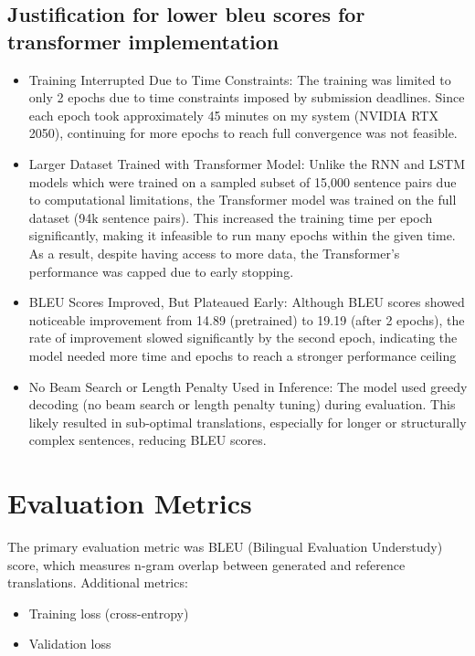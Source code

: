 \documentclass[12pt]{article}
\begin{document}
\subsection{Justification for lower bleu scores for transformer implementation}
\begin{itemize}
    \item  Training Interrupted Due to Time Constraints: The training was limited to only 2 epochs due to time constraints imposed by submission deadlines. Since each epoch took approximately 45 minutes on my system (NVIDIA RTX 2050), continuing for more epochs to reach full convergence was not feasible.
    \item Larger Dataset Trained with Transformer Model: Unlike the RNN and LSTM models which were trained on a sampled subset of 15,000 sentence pairs due to computational limitations, the Transformer model was trained on the full dataset (94k sentence pairs). This increased the training time per epoch significantly, making it infeasible to run many epochs within the given time. As a result, despite having access to more data, the Transformer’s performance was capped due to early stopping.
    \item BLEU Scores Improved, But Plateaued Early: Although BLEU scores showed noticeable improvement from 14.89 (pretrained) to 19.19 (after 2 epochs), the rate of improvement slowed significantly by the second epoch, indicating the model needed more time and epochs to reach a stronger performance ceiling
    \item No Beam Search or Length Penalty Used in Inference: The model used greedy decoding (no beam search or length penalty tuning) during evaluation. This likely resulted in sub-optimal translations, especially for longer or structurally complex sentences, reducing BLEU scores.
\end{itemize}

\section{Evaluation Metrics}
The primary evaluation metric was BLEU (Bilingual Evaluation Understudy) score, which measures n-gram overlap between generated and reference translations. Additional metrics:

\begin{itemize}
    \item Training loss (cross-entropy)
    \item Validation loss

\end{itemize}
\end{document}
